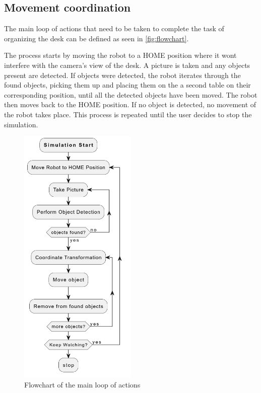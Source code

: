 \subsection{Movement coordination}

The main loop of actions that need to be taken to complete the task of organizing the desk can be defined as seen in \vref{fig:flowchart}. 

The process starts by moving the robot to a HOME position where it wont interfere with the camera's view of the desk. A picture is taken and any objects present are detected. If objects were detected, the robot iterates through the found objects, picking them up and placing them on the a second table on their corresponding position, until all the detected objects have been moved. The robot then moves back to the HOME position. If no object is detected, no movement of the robot takes place. This process is repeated until the user decides to stop the simulation.



\begin{figure}[!h]
    \centering
    \includegraphics[width=0.5\textwidth]{Figures/sim_loop.png}
    \caption{Flowchart of the main loop of actions}
    \label{fig:flowchart}
\end{figure}

